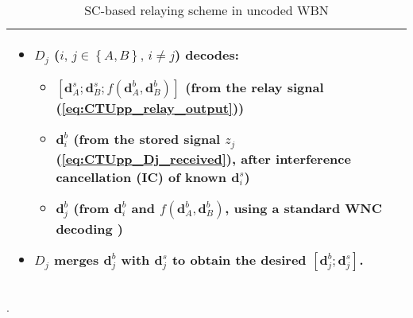 \documentclass{article}
\begin{document}
\begin{table}
\begin{tabular}{|>{\raggedright}p{}|}
\begin{itemize}
\item $D_{j}$ ($i,\,j\in\left\{ A,B\right\} ,\,i\neq j$) decodes:

\begin{itemize}
\item $\left[\mathbf{d}_{A}^{s};\mathbf{d}_{B}^{s};f(\mathbf{d}_{A}^{b},\mathbf{d}_{B}^{b})\right]$
(from the relay signal (\ref{eq:CTUpp_relay_output}))
\item $\mathbf{d}_{i}^{b}$ (from the stored signal $z_{j}$ (\ref{eq:CTUpp_Dj_received}),
after interference cancellation (IC) of known $\mathbf{d}_{i}^{s}$)
\item $\mathbf{d}_{j}^{b}$ (from $\mathbf{d}_{i}^{b}$ and $f(\mathbf{d}_{A}^{b},\mathbf{d}_{B}^{b})$,
using a standard WNC decoding \cite{Sykora-Burr_2011-TVT})
\end{itemize}
\item $D_{j}$ merges $\mathbf{d}_{j}^{b}$ with $\mathbf{d}_{j}^{s}$ to
obtain the desired $\left[\mathbf{d}_{j}^{b};\mathbf{d}_{j}^{s}\right]$.\end{itemize}
\tabularnewline
\hline 
\end{tabular}\caption{SC-based relaying scheme in uncoded WBN}.\label{tab:CTUpp_SC-relaying-scheme}
\end{table}
\end{document}
